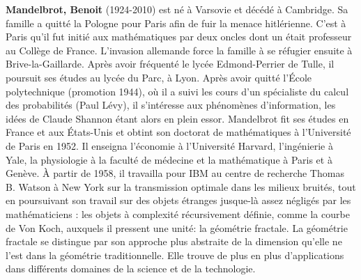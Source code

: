 \textbf{Mandelbrot, Benoit} (1924-2010) est né à Varsovie et décédé à Cambridge. Sa famille a quitté la Pologne pour Paris afin de fuir la menace hitlérienne. C'est à Paris qu'il fut initié aux mathématiques par deux oncles dont un était professeur au Collège de France. L'invasion allemande force la famille à se réfugier ensuite à Brive-la-Gaillarde. Après avoir fréquenté le lycée Edmond-Perrier de Tulle, il poursuit ses études au lycée du Parc, à Lyon. Après avoir quitté l'École polytechnique (promotion 1944), où il a suivi les cours d'un spécialiste du calcul des probabilités (Paul Lévy), il s'intéresse aux phénomènes d'information, les idées de Claude Shannon étant alors en plein essor. Mandelbrot fit ses études en France et aux États-Unis et obtint son doctorat de mathématiques à l'Université de Paris en 1952. Il enseigna l'économie à l'Université Harvard, l'ingénierie à Yale, la physiologie à la faculté de médecine et la mathématique à Paris et à Genève. À partir de 1958, il travailla pour IBM au centre de recherche Thomas B. Watson à New York sur la transmission optimale dans les milieux bruités, tout en poursuivant son travail sur des objets étranges jusque-là assez négligés par les mathématiciens : les objets à complexité récursivement définie, comme la courbe de Von Koch, auxquels il pressent une unité: la géométrie fractale. La géométrie fractale se distingue par son approche plus abstraite de la dimension qu'elle ne l'est dans la géométrie traditionnelle. Elle trouve de plus en plus d'applications dans différents domaines de la science et de la technologie.



